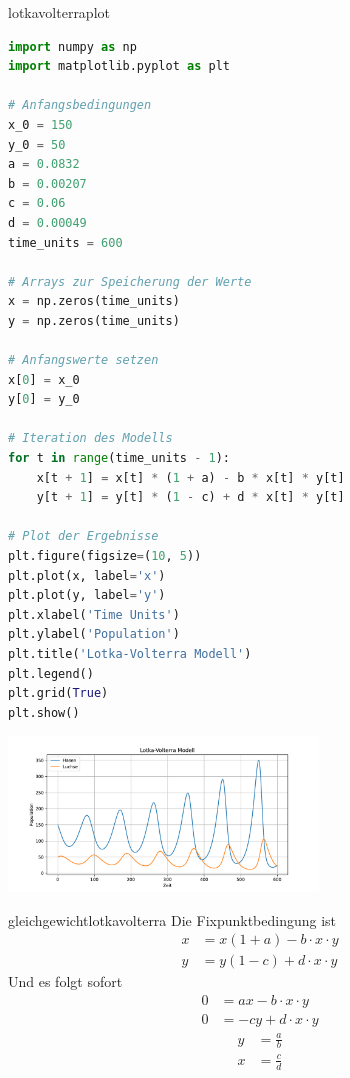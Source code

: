 \documentclass[%
<<<<<<< Updated upstream
11pt,%
twoside,%
titlepage,%
german,%
headsepline%
]{scrartcl}
\begin{document}
\begin{lsg}{lotkavolterraplot}
    \begin{lstlisting}[language=python]
import numpy as np
import matplotlib.pyplot as plt

# Anfangsbedingungen
x_0 = 150
y_0 = 50
a = 0.0832
b = 0.00207
c = 0.06
d = 0.00049
time_units = 600

# Arrays zur Speicherung der Werte
x = np.zeros(time_units)
y = np.zeros(time_units)

# Anfangswerte setzen
x[0] = x_0
y[0] = y_0

# Iteration des Modells
for t in range(time_units - 1):
    x[t + 1] = x[t] * (1 + a) - b * x[t] * y[t]
    y[t + 1] = y[t] * (1 - c) + d * x[t] * y[t]

# Plot der Ergebnisse
plt.figure(figsize=(10, 5))
plt.plot(x, label='x')
plt.plot(y, label='y')
plt.xlabel('Time Units')
plt.ylabel('Population')
plt.title('Lotka-Volterra Modell')
plt.legend()
plt.grid(True)
plt.show()
\end{lstlisting}

\begin{center}
\includegraphics[width=0.618\textwidth]{pictures/hasenluchsepdf.pdf}
\end{center}

\end{lsg}

\begin{lsg}{gleichgewichtlotkavolterra}
Die Fixpunktbedingung ist
\begin{align*}
x &= x(1+a)-b\cdot x\cdot y\\
y &= y(1-c)+d\cdot x\cdot y
\end{align*}
Und es folgt sofort
\begin{align*}
0 &= ax-b\cdot x\cdot y\\
0 &= -cy+d\cdot x\cdot y
\end{align*}
\begin{align*}
y &= \frac{a}{b}\\
x &= \frac{c}{d}
\end{align*}
\end{lsg}
\end{document}
